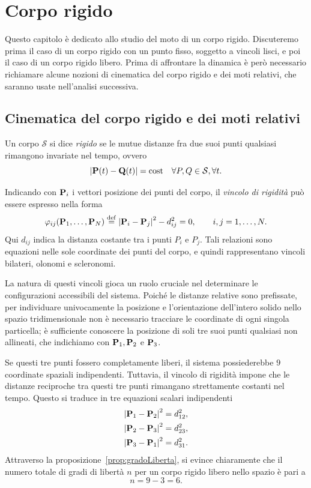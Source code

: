 \chapter{Corpo rigido}

Questo capitolo è dedicato allo studio del moto di un corpo rigido. Discuteremo prima il caso di un corpo rigido con un punto fisso, soggetto a vincoli lisci, e poi il caso di un corpo rigido libero. Prima di affrontare la dinamica è però necessario richiamare alcune nozioni di cinematica del corpo rigido e dei moti relativi, che saranno usate nell'analisi successiva.

\section{Cinematica del corpo rigido e dei moti relativi} 
\begin{definition}
    Un corpo $\mathcal{S}$ si dice \emph{rigido} se le mutue distanze fra due suoi punti qualsiasi rimangono invariate nel tempo, ovvero
    \begin{equation*}
        \abs{\vb{P}(t) - \vb{Q}(t)} = \text{cost} \quad \forall P, Q \in \mathcal{S}, \forall t.
    \end{equation*}
\end{definition}

Indicando con $\vb{P}_i$ i vettori posizione dei punti del corpo, il \emph{vincolo di rigidità} può essere espresso nella forma
\begin{equation*}
    \varphi_{ij}(\vb{P}_1, \dots, \vb{P}_N)
    \overset{\mathrm{def}}{=} \abs{\vb{P}_i - \vb{P}_j}^2 - d_{ij}^2 = 0,
    \qquad i,j = 1,\dots,N.
\end{equation*}
Qui $d_{ij}$ indica la distanza costante tra i punti $P_i$ e $P_j$. Tali relazioni sono equazioni nelle sole coordinate dei punti del corpo, e quindi rappresentano vincoli bilateri, olonomi e scleronomi.

La natura di questi vincoli gioca un ruolo cruciale nel determinare le configurazioni accessibili del sistema. Poiché le distanze relative sono prefissate, per individuare univocamente la posizione e l'orientazione dell'intero solido nello spazio tridimensionale non è necessario tracciare le coordinate di ogni singola particella; è sufficiente conoscere la posizione di soli tre suoi punti qualsiasi non allineati, che indichiamo con $\vb{P}_1, \vb{P}_2$ e $\vb{P}_3$.

Se questi tre punti fossero completamente liberi, il sistema possiederebbe $9$ coordinate spaziali indipendenti. Tuttavia, il vincolo di rigidità impone che le distanze reciproche tra questi tre punti rimangano strettamente costanti nel tempo. Questo si traduce in tre equazioni scalari indipendenti
\begin{align*}
    \abs{\vb{P}_1 - \vb{P}_2}^2 &= d_{12}^2, \\
    \abs{\vb{P}_2 - \vb{P}_3}^2 &= d_{23}^2, \\
    \abs{\vb{P}_3 - \vb{P}_1}^2 &= d_{31}^2.
\end{align*}
Attraverso la proposizione~\ref{prop:gradoLiberta}, si evince chiaramente che il numero totale di gradi di libertà $n$ per un corpo rigido libero nello spazio è pari a
\[ n = 9 - 3 = 6. \]

